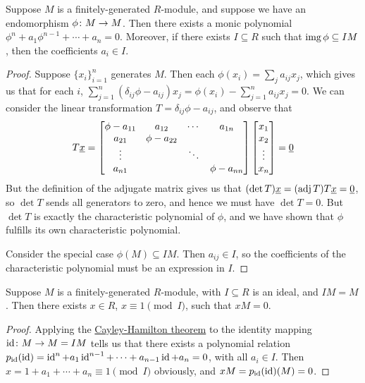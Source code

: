 \begin{lemma}\label{lem:cayley-hamilton}
    Suppose \(M\) is a finitely-generated \(R\)-module,
    and suppose we have an endomorphism \(\phi\colon M\to M\).
    Then there exists a monic polynomial \(\phi^n + a_1\phi^{n-1} + \cdots + a_n = 0\).
    Moreover, if there exists \(I \subseteq R\) such that \(\operatorname{img}\phi \subseteq IM\),
    then the coefficients \(a_i \in I\).
\end{lemma}
\begin{proof}
    Suppose \({\{x_i\}}_{i=1}^n\) generates \(M\).
    Then each \(\phi(x_i) = \sum_j a_{ij}x_j\),
    which gives us that for each \(i\),
    \(\sum_{j=1}^n (\delta_{ij}\phi - a_{ij})x_j = \phi(x_i) - \sum_{j=1}^n a_{ij}x_j = 0\).
    We can consider the linear transformation \(T = \delta_{ij}\phi - a_{ij}\),
    and observe that
    \begin{equation*}
        T\vec{x} =
        \begin{bmatrix}
            \phi-a_{11} & a_{12} & \cdots & a_{1n} \\
            a_{21} & \phi-a_{22} \\
            \vdots & & \ddots \\
            a_{n1} & & & \phi-a_{nn}
        \end{bmatrix}
        \bmqty{x_1 \\ x_2 \\ \vdots \\ x_n}
        = \vec{0}
    \end{equation*}
    But the definition of the adjugate matrix gives us that
    \((\det T)\underline{x} = (\operatorname{adj} T)T\underline{x} = \underline{0}\),
    so \(\det T\) sends all generators to zero,
    and hence we must have \(\det T = 0\).
    But \(\det T\) is exactly the characteristic polynomial of \(\phi\),
    and we have shown that \(\phi\) fulfills its own characteristic polynomial.

    Consider the special case \(\phi(M) \subseteq IM\).
    Then \(a_{ij} \in I\),
    so the coefficients of the characteristic polynomial
    must be an expression in \(I\).
\end{proof}
\begin{corollary}\label{cor:nakayama}
    Suppose \(M\) is a finitely-generated \(R\)-module,
    with \(I \subseteq R\) is an ideal, and \(IM = M\).
    Then there exists \(x \in R\), \(x \equiv 1\pmod{I}\), such that \(xM = 0\).
\end{corollary}
\begin{proof}
    Applying the \hyperref[lem:cayley-hamilton]{Cayley-Hamilton theorem}
    to the identity mapping \(\operatorname{id}\colon M\to M = IM\)
    tells us that there exists a polynomial relation
    \(p_{\operatorname{id}}(\operatorname{id}) = \operatorname{id}^n + a_1\operatorname{id}^{n-1} + \cdots + a_{n-1}\operatorname{id} + a_n = 0\),
    with all \(a_i \in I\).
    Then \(x = 1 + a_1 + \cdots + a_n \equiv 1 \pmod{I}\) obviously,
    and \(xM = p_{\operatorname{id}}(\operatorname{id})(M) = 0\).
\end{proof}
